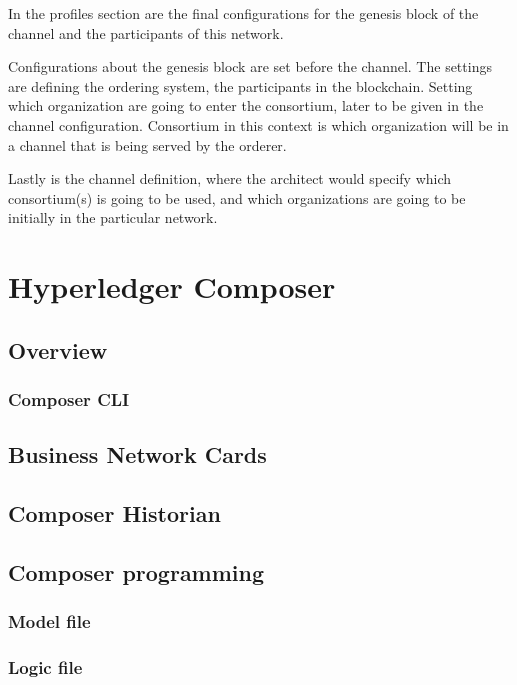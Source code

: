 \documentclass[a4paper,11pt]{report}
\begin{document}
In the profiles section are the final configurations for the genesis block of the channel and the participants of this network. 

Configurations about the genesis block are set before the channel. The settings are defining the ordering system, the participants in the blockchain. Setting which organization are going to enter the consortium, later to be given in the channel configuration. Consortium in this context is which organization will be in a channel that is being served by the orderer. 

Lastly is the channel definition, where the architect would specify which consortium(s) is going to be used, and which organizations are going to be initially in the particular network.

 

\chapter{Hyperledger Composer}
\label{hplComposer}

\section{Overview}

\subsection{Composer CLI}

\section{Business Network Cards}

\section{Composer Historian}

\section{Composer programming}

\subsection{Model file}
\subsection{Logic file}
\end{document}

